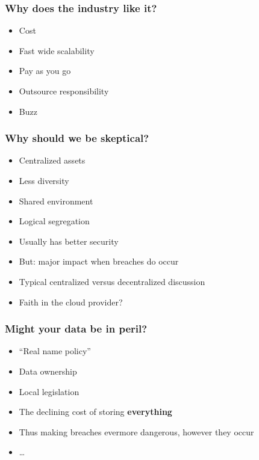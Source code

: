 \documentclass{beamer}
\begin{document}
\begin{frame}
    \frametitle{Why does the industry like it?}
    \begin{itemize}
        \item Cost
        \item Fast wide scalability
        \item Pay as you go
        \item Outsource responsibility
        \item Buzz
    \end{itemize}
\end{frame}

\begin{frame}
    \frametitle{Why should we be skeptical?}
    \begin{itemize}
        \item Centralized assets
        \item Less diversity
        \item Shared environment
        \item Logical segregation
        \item Usually has better security
        \item But: major impact when breaches do occur
        \item Typical centralized versus decentralized discussion
        \item Faith in the cloud provider?
    \end{itemize}
\end{frame}

\begin{frame}
    \frametitle{Might your data be in peril?}
    \begin{itemize}
        \item ``Real name policy''
        \item Data ownership
        \item Local legislation %
        \item The declining cost of storing \textbf{everything}
        \item Thus making breaches evermore dangerous, however they occur
        \item \dots
    \end{itemize}
\end{frame}
\end{document}
